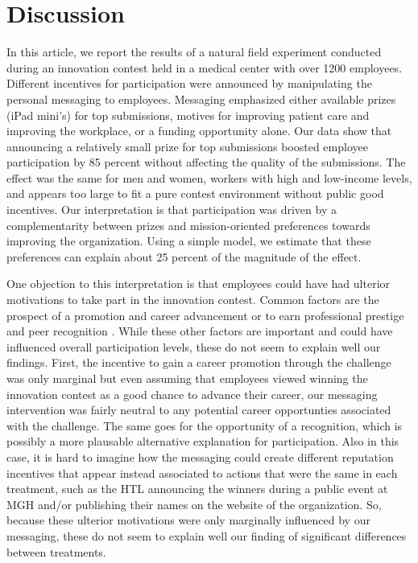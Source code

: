 \documentclass[11pt, titlepage]{article}
\begin{document}
\section{Discussion}\label{discussion}

In this article, we report the results of a natural field experiment
conducted during an innovation contest held in a medical center with
over 1200 employees. Different incentives for participation were
announced by manipulating the personal messaging to employees. Messaging
emphasized either available prizes (iPad mini's) for top submissions,
motives for improving patient care and improving the workplace, or a
funding opportunity alone. Our data show that announcing a relatively
small prize for top submissions boosted employee participation by 85
percent without affecting the quality of the submissions. The effect was
the same for men and women, workers with high and low-income levels, and
appears too large to fit a pure contest environment without public good
incentives. Our interpretation is that participation was driven by a
complementarity between prizes and mission-oriented preferences towards
improving the organization. Using a simple model, we estimate that these
preferences can explain about 25 percent of the magnitude of the effect.

One objection to this interpretation is that employees could have had
ulterior motivations to take part in the innovation contest. Common
factors are the prospect of a promotion and career advancement
\citep{baker1994internal, gibbs1995incentive} or to earn professional
prestige and peer recognition
\citep{kosfeld2011getting, blanes2011tournaments}. While these other
factors are important and could have influenced overall participation
levels, these do not seem to explain well our findings. First, the
incentive to gain a career promotion through the challenge was only
marginal but even assuming that employees viewed winning the innovation
contest as a good chance to advance their career, our messaging
intervention was fairly neutral to any potential career opportunties
associated with the challenge. The same goes for the opportunity of a
recognition, which is possibly a more plausable alternative explanation
for participation. Also in this case, it is hard to imagine how the
messaging could create different reputation incentives that appear
instead associated to actions that were the same in each treatment, such
as the HTL announcing the winners during a public event at MGH and/or
publishing their names on the website of the organization. So, because
these ulterior motivations were only marginally influenced by our
messaging, these do not seem to explain well our finding of significant
differences between treatments.
\end{document}

